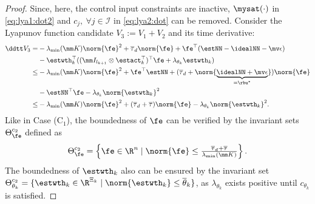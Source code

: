 \documentclass[lettersize,journal]{IEEEtran}
\begin{document}
\begin{proof}
Since, here, the control input constraints are inactive, $\mysat(\cdot)$ in \eqref{eq:lya1:dot2} and $c_j,\ \forall j\in\mathcal{I}$ in \eqref{eq:lya2:dot} can be removed.
Consider the Lyapunov function candidate $V_3:=V_1+V_2$ and its time derivative:
\begin{equation}
    \begin{aligned}
        \ddtt V_3
        =&
        -\lambda_{\min}(\mm K)\norm{\fe}^2
        +\overline\tau_d\norm{\fe}
        +\fe^\top (\estNN - \idealNN - \mv\epsilon)
        \\
        &
        -\estwth_k^\top (
            (\mm I_{l_{k+1}}\otimes \estact_k^\top)^\top
            \fe
            +
            \lambda_{\theta_k}\estwth_k
        )
        \\
        \le&
        -\lambda_{\min}(\mm K)\norm{\fe}^2
        +\fe^\top \estNN
        +(
            \overline\tau_d+\norm{
                \underbrace{
                    \idealNN+\mv\epsilon
                }_{=\rbu^*}
            }
        )
        \norm{\fe}
        \\
        &
        -\estNN^\top\fe 
        -\lambda_{\theta_k}\norm{\estwth_k}^2
        \\
        \le&
        -\lambda_{\min}(\mm K)\norm{\fe}^2
        +(\overline\tau_d+\overline\tau)
        \norm{\fe}
        -\lambda_{\theta_k}\norm{\estwth_k}^2
        .
    \end{aligned}
    \label{eq:lya3:dot}
\end{equation}
Like in Case (C$_1$), the boundedness of $\fe$ can be verified by the invariant sets $\Theta_{\fe}^{c_2}$ defined as
\begin{equation}
    \Theta_{\fe}^{c_2}
    =
    \left\{ 
        \fe \in \R^n 
        \mid 
        \norm{\fe} 
        \le 
        \tfrac{
            \overline\tau_d+\overline\tau
        }{
            \lambda_{\min}(\mm K)
        }
    \right\}
    .
\end{equation}
The boundedness of $\estwth_k$ also can be ensured by the invariant set $\Theta_{\theta_k}^{c_2}=\{ \estwth_k \in \R^{\Xi_{k}} \mid \norm{\estwth_k} \le \overline\theta_k \}$, as $\lambda_{\theta_k}$ exists positive until $c_{\theta_k}$ is satisfied.

\hfill 


\end{proof}
\end{document}
